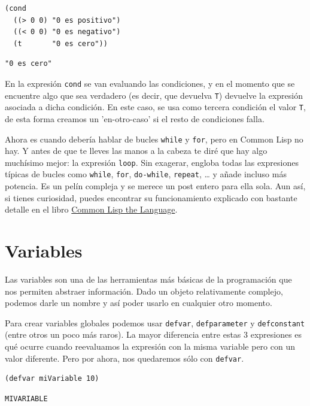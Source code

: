 \documentclass[11pt]{article}
\begin{document}
\begin{verbatim}
(cond
  ((> 0 0) "0 es positivo")
  ((< 0 0) "0 es negativo")
  (t       "0 es cero"))
\end{verbatim}

\begin{verbatim}
"0 es cero"
\end{verbatim}


En la expresión \texttt{cond} se van evaluando las condiciones, y en el momento que se encuentre algo que sea verdadero (es decir, que devuelva \texttt{T}) devuelve la expresión asociada a dicha condición. En este caso, se usa como tercera condición el valor \texttt{T}, de esta forma creamos un 'en-otro-caso' si el resto de condiciones falla.

Ahora es cuando debería hablar de bucles \texttt{while} y \texttt{for}, pero en Common Lisp no hay. Y antes de que te lleves las manos a la cabeza te diré que hay algo muchísimo mejor: la expresión \texttt{loop}. Sin exagerar, engloba todas las expresiones típicas de bucles como \texttt{while}, \texttt{for}, \texttt{do-while}, \texttt{repeat}, \ldots{} y añade incluso más potencia. Es un pelín compleja y se merece un post entero para ella sola. Aun así, si tienes curiosidad, puedes encontrar su funcionamiento explicado con bastante detalle en el libro \href{https://www.cs.cmu.edu/Groups/AI/html/cltl/clm/node235.html}{Common Lisp the Language}.

\section{Variables}
\label{sec:org83d9e09}

Las variables son una de las herramientas más básicas de la programación que nos permiten abstraer información. Dado un objeto relativamente complejo, podemos darle un nombre y así poder usarlo en cualquier otro momento.

Para crear variables globales podemos usar \texttt{defvar}, \texttt{defparameter} y \texttt{defconstant} (entre otros un poco más raros). La mayor diferencia entre estas 3 expresiones es qué ocurre cuando reevaluamos la expresión con la misma variable pero con un valor diferente. Pero por ahora, nos quedaremos sólo con \texttt{defvar}.

\begin{verbatim}
(defvar miVariable 10)
\end{verbatim}

\begin{verbatim}
MIVARIABLE
\end{verbatim}
\end{document}
